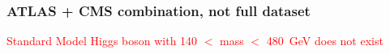 \documentclass[compress]{beamer}
\begin{document}
\begin{frame}
\frametitle{ATLAS + CMS combination, not full dataset}

\textcolor{red}{Standard Model Higgs boson with 140 $<$ mass $<$ 480~GeV does not exist}

\end{frame}
\end{document}
